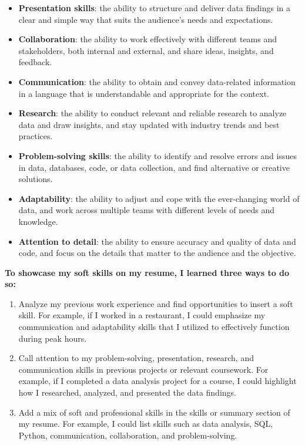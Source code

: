 \documentclass[]{article}
\begin{document}
\begin{itemize}
  \item \textbf{Presentation skills}: the ability to structure and deliver data findings in a clear and simple way that suits the audience's needs and expectations.
  \item \textbf{Collaboration}: the ability to work effectively with different teams and stakeholders, both internal and external, and share ideas, insights, and feedback.
  \item \textbf{Communication}: the ability to obtain and convey data-related information in a language that is understandable and appropriate for the context.
  \item \textbf{Research}: the ability to conduct relevant and reliable research to analyze data and draw insights, and stay updated with industry trends and best practices.
  \item \textbf{Problem-solving skills}: the ability to identify and resolve errors and issues in data, databases, code, or data collection, and find alternative or creative solutions.
  \item \textbf{Adaptability}: the ability to adjust and cope with the ever-changing world of data, and work across multiple teams with different levels of needs and knowledge.
  \item \textbf{Attention to detail}: the ability to ensure accuracy and quality of data and code, and focus on the details that matter to the audience and the objective.
\end{itemize}

\textbf{To showcase my soft skills on my resume, I learned three ways to do so:}

\begin{enumerate}
  \item Analyze my previous work experience and find opportunities to insert a soft skill. For example, if I worked in a restaurant, I could emphasize my communication and adaptability skills that I utilized to effectively function during peak hours.
  \item Call attention to my problem-solving, presentation, research, and communication skills in previous projects or relevant coursework. For example, if I completed a data analysis project for a course, I could highlight how I researched, analyzed, and presented the data findings.
  \item Add a mix of soft and professional skills in the skills or summary section of my resume. For example, I could list skills such as data analysis, SQL, Python, communication, collaboration, and problem-solving.
\end{enumerate}
\end{document}
